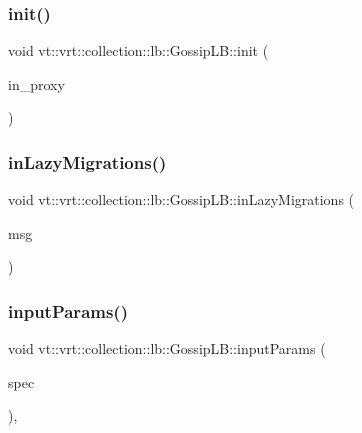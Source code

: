 \subsubsection{\texorpdfstring{init()}{init()}}
{\footnotesize\ttfamily void vt\+::vrt\+::collection\+::lb\+::\+Gossip\+L\+B\+::init (\begin{DoxyParamCaption}\item[{\hyperlink{structvt_1_1objgroup_1_1proxy_1_1_proxy}{objgroup\+::proxy\+::\+Proxy}$<$ \hyperlink{structvt_1_1vrt_1_1collection_1_1lb_1_1_gossip_l_b}{Gossip\+LB} $>$}]{in\+\_\+proxy }\end{DoxyParamCaption})}

\mbox{\label{structvt_1_1vrt_1_1collection_1_1lb_1_1_gossip_l_b_a2fa63a6d2dc211423423b0d7de1d1ed6}} 
\subsubsection{\texorpdfstring{in\+Lazy\+Migrations()}{inLazyMigrations()}}
{\footnotesize\ttfamily void vt\+::vrt\+::collection\+::lb\+::\+Gossip\+L\+B\+::in\+Lazy\+Migrations (\begin{DoxyParamCaption}\item[{\hyperlink{structvt_1_1vrt_1_1collection_1_1balance_1_1_lazy_migration_msg}{balance\+::\+Lazy\+Migration\+Msg} $\ast$}]{msg }\end{DoxyParamCaption})\hspace{0.3cm}{\ttfamily [protected]}}

\mbox{\label{structvt_1_1vrt_1_1collection_1_1lb_1_1_gossip_l_b_abc000890ad1743faae2fe853d73485bb}} 
\subsubsection{\texorpdfstring{input\+Params()}{inputParams()}}
{\footnotesize\ttfamily void vt\+::vrt\+::collection\+::lb\+::\+Gossip\+L\+B\+::input\+Params (\begin{DoxyParamCaption}\item[{\hyperlink{structvt_1_1vrt_1_1collection_1_1balance_1_1_spec_entry}{balance\+::\+Spec\+Entry} $\ast$}]{spec }\end{DoxyParamCaption})\hspace{0.3cm}{\ttfamily [override]}, {\ttfamily [virtual]}}



